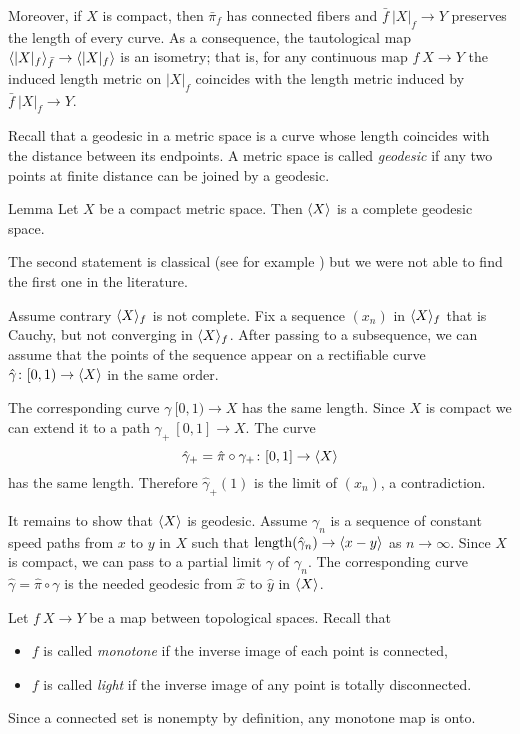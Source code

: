 \documentclass{article}
\begin{document}
Moreover, if $X$ is compact, then $\bar\pi_f$ has connected fibers and $\bar f\:|X|_f\to Y$ preserves the length of every curve.
As a consequence,  the tautological map $\<|X|_f\>_{\bar f}\zz\to \<|X|_f\>$ is an isometry;
that is, for any continuous map $f\:X\to Y$ the induced length metric on $|X|_f$ coincides with the length metric induced by 
$\bar f\:|X|_f\to Y$.


Recall that a geodesic in a metric space is a curve whose length coincides with the distance between its endpoints.
A metric space is called \emph{geodesic} if any two points at finite distance can be joined by a geodesic.

\begin{thm}{Lemma}\label{lem:geospace}
Let $X$ be a compact metric space. 
Then $\langle X\rangle$ is a complete geodesic space.
\end{thm}

The second statement is classical (see for example \cite[II-\S8 Thm. 3]{KF}) but 
we were not able to find the first one in the literature.

Assume contrary $\langle X\rangle_f$ is not complete.
Fix a sequence $(x_n)$ in $\langle X\rangle_f$ that is Cauchy, but not converging in $\langle X\rangle_f$.
After passing to a subsequence, we can assume that the points of the sequence appear on a rectifiable curve $\hat\gamma\colon[0,1)\to\langle X\rangle$ in the same order.

The corresponding curve $\gamma\:[0,1)\to X$ has the same length.
Since $X$ is compact we can extend it to a path $\gamma_+\:[0,1]\to X$.
The curve 
\[\hat\gamma_+=\hat\pi\circ\gamma_+\colon[0,1]\to\langle X\rangle\]
has the same length.
Therefore $\hat\gamma_+(1)$ is the limit of $(x_n)$, a contradiction.

It remains to show that $\langle X\rangle$ is geodesic.
Assume $\gamma_n$ is a sequence of constant speed paths from $x$ to $y$ in $X$
such that $\mathop{\rm length}\nolimits(\hat\gamma_n)\to \langle x-y\rangle$ as $n\to\infty$.
Since $X$ is compact, we can pass to a partial limit $\gamma$ of  $\gamma_n$.
The corresponding curve $\hat\gamma=\hat \pi\circ\gamma$ is the needed geodesic from $\hat x$ to $\hat y$ in $\langle X\rangle$.
\qeds

Let $f\:X\to Y$ be a map between topological spaces.
Recall that 
\begin{itemize}
\item $f$ is called \emph{monotone} if the inverse image of each point is connected,
 \item $f$ is called \emph{light} if the inverse image of any point is totally disconnected.
\end{itemize}
Since a connected set is nonempty by definition, any monotone map is onto.
\end{document}
